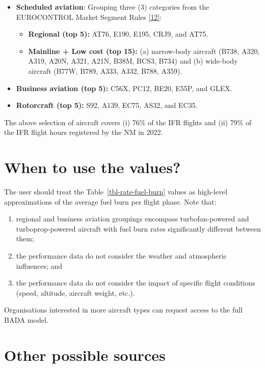 \documentclass[
  11pt,
  a4paper,
]{book}
\begin{document}
\begin{itemize}
\item
  \textbf{Scheduled aviation}: Grouping three (3) categories from the
  EUROCONTROL Market Segment Rules
  \protect\hyperlink{ref-ectl:market:seg:2022}{{[}12{]}}:

  \begin{itemize}
  \item
    \textbf{Regional (top 5):} AT76, E190, E195, CRJ9, and AT75.
  \item
    \textbf{Mainline + Low cost (top 15):} (a) narrow-body aircraft
    (B738, A320, A319, A20N, A321, A21N, B38M, BCS3, B734) and (b)
    wide-body aircraft (B77W, B789, A333, A332, B788, A359).
  \end{itemize}
\item
  \textbf{Business aviation (top 5):} C56X, PC12, BE20, E55P, and GLEX.
\item
  \textbf{Rotorcraft (top 5):} S92, A139, EC75, AS32, and EC35.
\end{itemize}

The above selection of aircraft covers (i) 76\% of the IFR flights and
(ii) 79\% of the IFR flight hours registered by the NM in 2022.

\hypertarget{when-to-use-the-values}{%
\section{When to use the values?}\label{when-to-use-the-values}}

The user should treat the Table~\ref{tbl-rate-fuel-burn} values as
high-level approximations of the average fuel burn per flight phase.
Note that:

\begin{enumerate}
\def\labelenumi{\roman{enumi})}
\item
  regional and business aviation groupings encompass turbofan-powered
  and turboprop-powered aircraft with fuel burn rates significantly
  different between them;
\item
  the performance data do not consider the weather and atmospheric
  influences; and
\item
  the performance data do not consider the impact of specific flight
  conditions (speed, altitude, aircraft weight, etc.).
\end{enumerate}

Organisations interested in more aircraft types can request access to
the full BADA model.

\hypertarget{other-possible-sources}{%
\section{Other possible sources}\label{other-possible-sources}}
\end{document}
